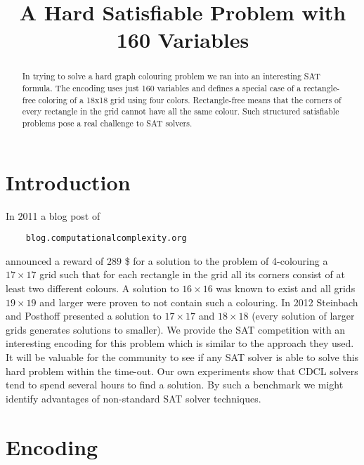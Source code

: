 \documentclass[conference]{IEEEtran}
\begin{document}
\title{A Hard Satisfiable Problem with 160 Variables}


\author{
}

\maketitle


\begin{abstract}
In trying to solve a hard graph colouring problem we ran into an interesting SAT formula. The encoding uses just 160
variables and defines a special case of a rectangle-free coloring of a 18x18 grid using four colors. Rectangle-free
means that the corners of every rectangle in the grid cannot have all the same colour. Such structured satisfiable
problems pose a real challenge to SAT solvers. 
\end{abstract}
\IEEEpeerreviewmaketitle

\section{Introduction}

In 2011 a blog post of
\begin{verbatim}
    blog.computationalcomplexity.org 
\end{verbatim} 
announced a reward of $289$ \$ for a solution to the problem of 4-colouring a $17\times 17$ grid such that for each
rectangle in the grid all its corners consist of at least two different colours. A solution to $16\times 16$ was known
to exist and all grids $19 \times 19$ and larger were proven to not contain such a colouring.  In 2012 Steinbach and
Posthoff presented a solution to $17\times 17$ and $18\times 18$ \cite{Steinbach12} (every solution of larger grids
generates solutions to smaller). We provide the SAT competition with an interesting encoding for this problem which is
similar to the approach they used. It will be valuable for the community to see if any SAT solver is able to solve this
hard problem within the time-out. Our own experiments show that CDCL solvers tend to spend several hours to find a
solution. By such a benchmark we might identify advantages of non-standard SAT solver techniques. 

\section{Encoding}
\end{document}

